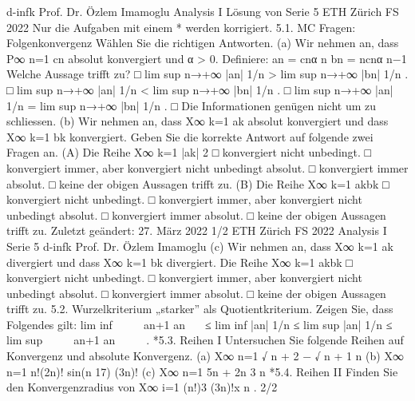 d-infk
Prof. Dr. Özlem Imamoglu
Analysis I
Lösung von Serie 5
ETH Zürich
FS 2022
Nur die Aufgaben mit einem * werden korrigiert.
5.1. MC Fragen: Folgenkonvergenz Wählen Sie die richtigen Antworten.
(a) Wir nehmen an, dass P∞
n=1 cn absolut konvergiert und α > 0. Definiere:
an = cnα
n
bn = ncnα
n−1
Welche Aussage trifft zu?
□ lim sup
n→+∞
|an|
1/n > lim sup
n→+∞
|bn|
1/n
.
□ lim sup
n→+∞
|an|
1/n < lim sup
n→+∞
|bn|
1/n
.
□ lim sup
n→+∞
|an|
1/n = lim sup
n→+∞
|bn|
1/n
.
□ Die Informationen genügen nicht um zu schliessen.
(b) Wir nehmen an, dass X∞
k=1
ak absolut konvergiert und dass X∞
k=1
bk konvergiert.
Geben Sie die korrekte Antwort auf folgende zwei Fragen an.
(A) Die Reihe X∞
k=1
|ak|
2
□ konvergiert nicht unbedingt.
□ konvergiert immer, aber konvergiert nicht unbedingt absolut.
□ konvergiert immer absolut.
□ keine der obigen Aussagen trifft zu.
(B) Die Reihe X∞
k=1
akbk
□ konvergiert nicht unbedingt.
□ konvergiert immer, aber konvergiert nicht unbedingt absolut.
□ konvergiert immer absolut.
□ keine der obigen Aussagen trifft zu.
Zuletzt geändert: 27. März 2022 1/2
ETH Zürich
FS 2022
Analysis I
Serie 5
d-infk
Prof. Dr. Özlem Imamoglu
(c) Wir nehmen an, dass X∞
k=1
ak divergiert und dass X∞
k=1
bk divergiert. Die Reihe
X∞
k=1
akbk
□ konvergiert nicht unbedingt.
□ konvergiert immer, aber konvergiert nicht unbedingt absolut.
□ konvergiert immer absolut.
□ keine der obigen Aussagen trifft zu.
5.2. Wurzelkriterium „starker” als Quotientkriterium. Zeigen Sie, dass
Folgendes gilt:
lim inf




an+1
an




≤ lim inf |an|
1/n ≤ lim sup |an|
1/n ≤ lim sup




an+1
an




.
*5.3. Reihen I Untersuchen Sie folgende Reihen auf Konvergenz und absolute
Konvergenz.
(a) X∞
n=1
√
n + 2 −
√
n + 1
n
(b) X∞
n=1
n!(2n)! sin(n
17)
(3n)!
(c) X∞
n=1
5n + 2n
3
n
*5.4. Reihen II Finden Sie den Konvergenzradius von
X∞
i=1
(n!)3
(3n)!x
n
.
2/2
